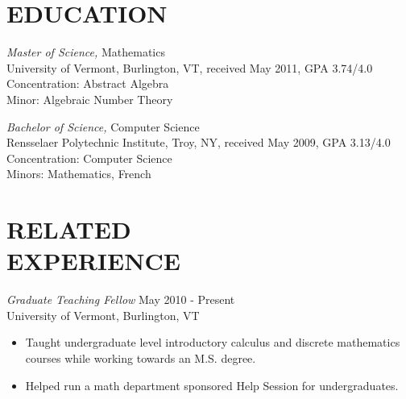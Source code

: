 \documentclass[line,margin]{res}
\begin{document}
\address{13B Franklin Street, Winooski, VT 05404}
\address{(802) 282-8205}

\begin{resume}
  
  
  \section{EDUCATION} {\sl Master of Science,} Mathematics\\
  University of Vermont, Burlington, VT, 
  received May 2011, 
  GPA 3.74/4.0\\
  Concentration: Abstract Algebra\\
  Minor: Algebraic Number Theory

  {\sl Bachelor of Science,} Computer Science \\
  Rensselaer Polytechnic Institute, Troy, NY, 
  received May 2009,
  GPA 3.13/4.0\\
  Concentration: Computer Science \\
  Minors: Mathematics, French\\

  \section{RELATED\\EXPERIENCE} 
  {\sl Graduate Teaching Fellow} \hfill May 2010 - Present \\
  University of Vermont, Burlington, VT\\
  \begin{itemize}  \itemsep -2pt %
  \item
    Taught undergraduate level introductory calculus and discrete mathematics courses while working towards an M.S. degree.
  \item 
    Helped run a math department sponsored Help Session for undergraduates.
  \end{itemize}


\end{resume}
\end{document}
